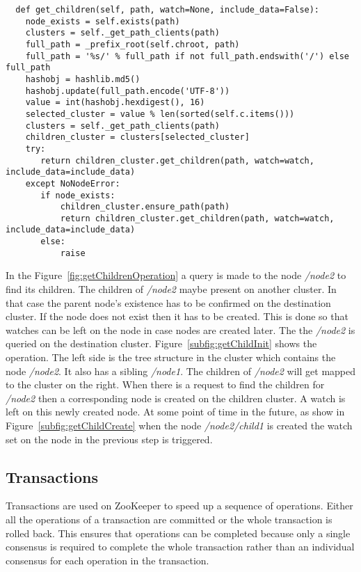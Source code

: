 \begin{lstlisting}
  def get_children(self, path, watch=None, include_data=False):
    node_exists = self.exists(path)
    clusters = self._get_path_clients(path)
    full_path = _prefix_root(self.chroot, path)
    full_path = '%s/' % full_path if not full_path.endswith('/') else full_path
    hashobj = hashlib.md5()
    hashobj.update(full_path.encode('UTF-8'))
    value = int(hashobj.hexdigest(), 16)
    selected_cluster = value % len(sorted(self.c.items()))
    clusters = self._get_path_clients(path)
    children_cluster = clusters[selected_cluster]
    try:
       return children_cluster.get_children(path, watch=watch, include_data=include_data)
    except NoNodeError:
       if node_exists:
           children_cluster.ensure_path(path)
           return children_cluster.get_children(path, watch=watch, include_data=include_data)
       else:
           raise
\end{lstlisting}



In the Figure~\ref{fig:getChildrenOperation} a query is made to the node \textit{/node2} to find its children. The children of \textit{/node2} maybe present on another cluster. In that case the parent node's existence has to be confirmed on the destination cluster. If the node does not exist then it has to be created. This is done so that watches can be left on the node in case nodes are created later. The the \textit{/node2} is queried on the destination cluster. Figure~\ref{subfig:getChildInit} shows the operation. The left side is the tree structure in the cluster which contains the node \textit{/node2}. It also has a sibling \textit{/node1}. The children of \textit{/node2} will get mapped to the cluster on the right. When there is a request to find the children for \textit{/node2} then a corresponding node is created on the children cluster. A watch is left on this newly created node. At some point of time in the future, as show in Figure~\ref{subfig:getChildCreate} when the node \textit{/node2/child1} is created the watch set on the node in the previous step is triggered.

\subsection{Transactions}
Transactions are used on ZooKeeper to speed up a sequence of operations. Either all the operations of a transaction are committed or the whole transaction is rolled back. This ensures that operations can be completed because only a single consensus is required to complete the whole transaction rather than an individual consensus for each operation in the transaction.
    
